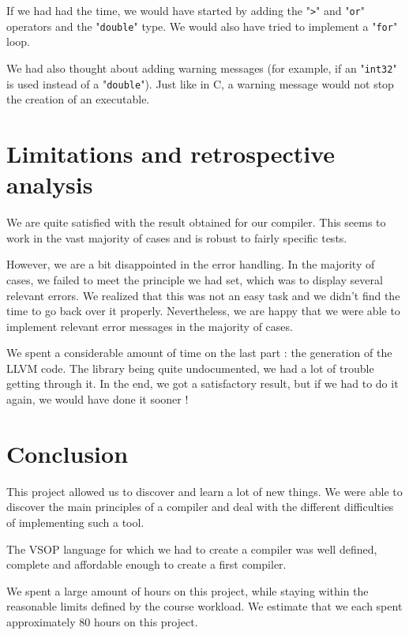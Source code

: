 \documentclass[a4paper, 12pt]{article}
\begin{document}
    If we had had the time, we would have started by adding the "\texttt{>}" and "\texttt{or}" operators and the "\texttt{double}" type. We would also have tried to implement a "\texttt{for}" loop.
    
    We had also thought about adding warning messages (for example, if an "\texttt{int32}" is used instead of a "\texttt{double}"). Just like in C, a warning message would not stop the creation of an executable.
    
    
    \section{Limitations and retrospective analysis}
    
    We are quite satisfied with the result obtained for our compiler. This seems to work in the vast majority of cases and is robust to fairly specific tests.
    
    However, we are a bit disappointed in the error handling. In the majority of cases, we failed to meet the principle we had set, which was to display several relevant errors. We realized that this was not an easy task and we didn't find the time to go back over it properly. Nevertheless, we are happy that we were able to implement relevant error messages in the majority of cases.
    
    We spent a considerable amount of time on the last part : the generation of the LLVM code. The library being quite undocumented, we had a lot of trouble getting through it. In the end, we got a satisfactory result, but if we had to do it again, we would have done it sooner !
    
    
    \section{Conclusion}
    
    This project allowed us to discover and learn a lot of new things. We were able to discover the main principles of a compiler and deal with the different difficulties of implementing such a tool.
    
    The VSOP language for which we had to create a compiler was well defined, complete and affordable enough to create a first compiler.
    
    We spent a large amount of hours on this project, while staying within the reasonable limits defined by the course workload. We estimate that we each spent approximately 80 hours on this project.
\end{document}
